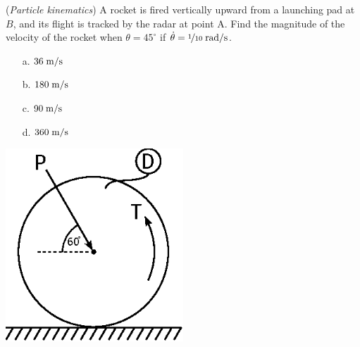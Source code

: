 \documentclass[addpoints, 12pt]{exam}
\begin{document}
\begin{questions}


\begin{minipage}{0.5\textwidth}
\question(\textit{Particle kinematics})
A rocket is fired vertically upward from a launching pad at $B$, and its flight
is tracked by the radar at point A. Find the magnitude of the velocity of the 
rocket when $\theta = 45^\circ$ if $\dot{\theta} = \nicefrac{1}{10}\;
\unit[per-mode=symbol]{\radian\per\second}$. \\[0.5ex]

\begin{minipage}{0.3\textwidth}
    \begin{center}
    \begin{itemize}
        \setlength\itemsep{-0.4em}
        \item[a.] $36 \; \unit[per-mode=symbol]{\meter\per\second}$
        \item[b.] $180 \; \unit[per-mode=symbol]{\meter\per\second}$
    \end{itemize}
    \end{center}
\end{minipage}
\begin{minipage}{0.3\textwidth}
    \begin{center}
    \begin{itemize}
        \setlength\itemsep{-0.4em}
        \item[c.] $90 \; \unit[per-mode=symbol]{\meter\per\second}$
        \item[d.] $360 \; \unit[per-mode=symbol]{\meter\per\second}$
    \end{itemize}
    \end{center}
\end{minipage}

\end{minipage}
%
\begin{minipage}{0.5\textwidth}
    \centering
    \includegraphics[width=0.5\textwidth,valign=c]{./figures/question6.eps}
\end{minipage}


\end{questions}
\end{document}
